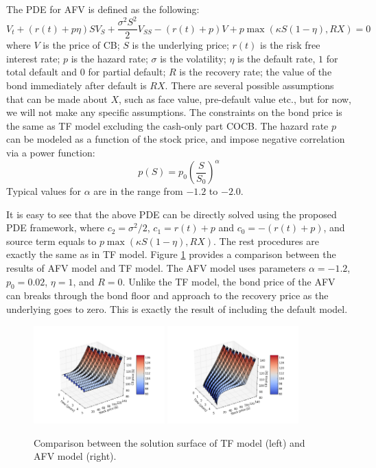 \documentclass[12pt]{article}
\begin{document}
The PDE for AFV is defined as the following:
\begin{equation}
V_t + (r(t) + p\eta)SV_S + \frac{\sigma^2S^2}{2}V_{SS} - (r(t)+p)V + p\max(\kappa S(1-\eta), RX) = 0
\label{eq:AFV_eqn}
\end{equation}
where $V$ is the price of CB; $S$ is the underlying price; $r(t)$ is the risk free interest rate; $p$ is the hazard rate; $\sigma$ is the volatility; $\eta$ is the default rate, $1$ for total default and $0$ for partial default; $R$ is the recovery rate; the value of the bond immediately after default is $RX$. There are several possible assumptions that can be made about $X$, such as face value, pre-default value etc., but for now, we will not make any specific assumptions. The constraints on the bond price is the same as TF model excluding the cash-only part COCB. The hazard rate $p$ can be modeled as a function of the stock price, and impose negative correlation via a power function:
\begin{equation}
p(S) = p_0(\frac{S}{S_0})^\alpha
\label{eq:hazard_rate}
\end{equation}
Typical values for $\alpha$ are in the range from $-1.2$ to $-2.0$.

It is easy to see that the above PDE can be directly solved using the proposed PDE framework, where $c_2 = \sigma^2/2$, $c_1 = r(t)+ p$ and $c_0 = -(r(t)+p)$, and source term equals to $p\max(\kappa S(1-\eta), RX)$. The rest procedures are exactly the same as in TF model. Figure \ref{fig:AFV_TF} provides a comparison between the results of AFV model and TF model. The AFV model uses parameters $\alpha = -1.2$, $p_0 = 0.02$, $\eta = 1$, and $R = 0$. Unlike the TF model, the bond price of the AFV can breaks through the bond floor and approach to the recovery price as the underlying goes to zero. This is exactly the result of including the default model.

\begin{figure}[!htbp]
\centering
\includegraphics[width=0.45\textwidth]{Figures/TF_model.png}
\includegraphics[width=0.45\textwidth]{Figures/AFV_model.png}
\caption{Comparison between the solution surface of TF model (left) and AFV model (right).}
\label{fig:AFV_TF}
\end{figure}
\end{document}

